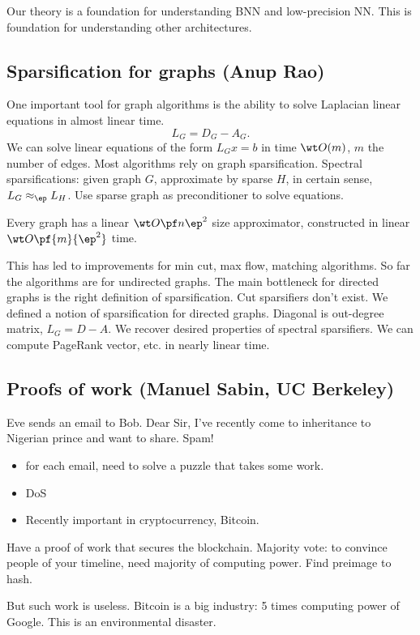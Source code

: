 Our theory is a foundation for understanding BNN and low-precision NN. This is foundation for understanding other architectures. 

\subsection{Sparsification for graphs (Anup Rao)}

One important tool for graph algorithms is the ability to solve Laplacian linear equations in almost linear time.
$$
L_G=D_G-A_G.
$$
We can solve linear equations of the form $L_Gx=b$ in time $\wt O(m)$, $m$ the number of edges. Most algorithms rely on graph sparsification. 
Spectral sparsifications: given graph $G$, approximate by sparse $H$, in certain sense, $L_G\approx_\ep L_H$. Use sparse graph as preconditioner to solve equations. 

Every graph has a linear $\wt O\pf n{\ep^2}$ size approximator, constructed in linear $\wt O\pf{m}{\ep^2}$ time. 

This has led to improvements for min cut, max flow, matching algorithms. So far the algorithms are for undirected graphs. The main bottleneck for directed graphs is the right definition of sparsification. Cut sparsifiers don't exist. We defined a notion of sparsification for directed graphs. Diagonal is out-degree matrix, $L_G=D-A$. We recover desired properties of spectral sparsifiers. We can compute PageRank vector, etc. in nearly linear time.

\subsection{Proofs of work (Manuel Sabin, UC Berkeley)}

Eve sends an email to Bob. Dear Sir, I've recently come to inheritance to Nigerian prince and want to share. Spam!
\begin{itemize}
\item
for each email, need to solve a puzzle that takes some work. 
\item
DoS
\item
Recently important in cryptocurrency, Bitcoin.
\end{itemize}

Have a proof of work that secures the blockchain. Majority vote: to convince people of your timeline, need majority of computing power. Find preimage to hash.

But such work is useless. Bitcoin is a big industry: 5 times computing power of Google. This is an environmental disaster.


